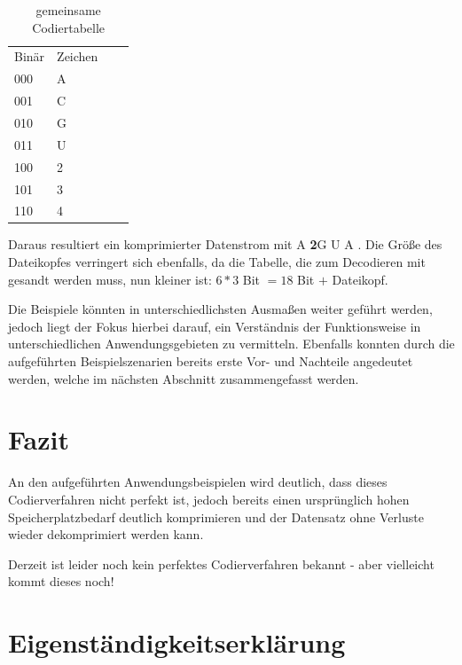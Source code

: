 \documentclass[11pt,a4paper,ngerman]{report}
\begin{document}
				\begin{table} [H]
				\begin{center}
					\centering
					\begin{tabular}{llll}
						Binär  & Zeichen &  &  \\
						000 & A       &  &  \\
						001 & C          &  &  \\
						010 & G          &  & \\
						011 & U	  & & \\
						100 & 2 & & \\
						101 & 3 & & \\
						110 & 4
						
					\end{tabular}
					\label{CT}		
					\caption{gemeinsame Codiertabelle}
				\end{center}
			\end{table}
		
		Daraus resultiert ein komprimierter Datenstrom mit A \textbf{2}G U A . Die Größe des Dateikopfes verringert sich ebenfalls, da die Tabelle, die zum Decodieren mit gesandt werden muss, nun kleiner  ist: $6 * 3$ Bit $= 18 $ Bit $+$ Dateikopf.
		
		Die Beispiele könnten  in unterschiedlichsten Ausmaßen weiter geführt werden, jedoch liegt der Fokus hierbei darauf, ein Verständnis der Funktionsweise in unterschiedlichen Anwendungsgebieten zu vermitteln. Ebenfalls konnten durch die aufgeführten Beispielszenarien bereits erste Vor- und Nachteile angedeutet werden, welche im nächsten Abschnitt zusammengefasst  werden.
	

		
	
	\chapter{Fazit}
	An den aufgeführten Anwendungsbeispielen wird deutlich, dass dieses Codierverfahren nicht perfekt ist, jedoch bereits einen ursprünglich hohen Speicherplatzbedarf deutlich komprimieren  und der Datensatz ohne Verluste wieder dekomprimiert werden kann.
	
	Derzeit ist leider noch kein perfektes Codierverfahren bekannt - aber vielleicht kommt dieses noch!
	
	\chapter{Eigenständigkeitserklärung}
	
\end{document}
